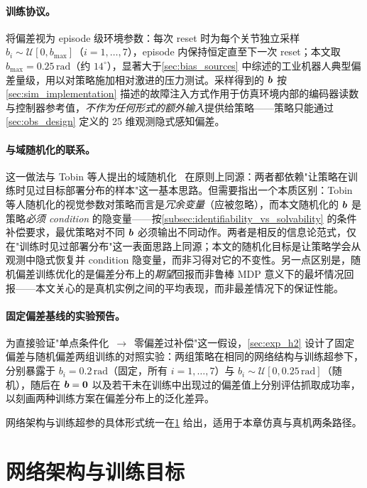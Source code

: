 \paragraph{训练协议。}将偏差视为 episode 级环境参数：每次 reset 时为每个关节独立采样 $b_i \sim \mathcal{U}[0, b_{\max}]$（$i = 1, \dots, 7$），episode 内保持恒定直至下一次 reset；本文取 $b_{\max} = 0.25\,\text{rad}$（约 $14^\circ$），显著大于\cref{sec:bias_sources} 中综述的工业机器人典型偏差量级，用以对策略施加相对激进的压力测试。采样得到的 $\bm{b}$ 按\cref{sec:sim_implementation} 描述的故障注入方式作用于仿真环境内部的编码器读数与控制器参考值，\emph{不作为任何形式的额外输入}提供给策略——策略只能通过\cref{sec:obs_design} 定义的 25 维观测隐式感知偏差。

\paragraph{与域随机化的联系。}这一做法与 Tobin 等人提出的域随机化~\cite{tobin2017domain} 在原则上同源：两者都依赖"让策略在训练时见过目标部署分布的样本"这一基本思路。但需要指出一个本质区别：Tobin 等人随机化的视觉参数对策略而言是\emph{冗余变量}（应被忽略），而本文随机化的 $\bm{b}$ 是策略\emph{必须 condition} 的隐变量——按\cref{subsec:identifiability_vs_solvability} 的条件补偿要求，最优策略对不同 $\bm{b}$ 必须输出不同动作。两者是相反的信息论范式，仅在"训练时见过部署分布"这一表面思路上同源；本文的随机化目标是让策略学会从观测中隐式恢复并 condition 隐变量，而非习得对它的不变性。另一点区别是，随机偏差训练优化的是偏差分布上的\emph{期望}回报而非鲁棒 MDP 意义下的最坏情况回报——本文关心的是真机实例之间的平均表现，而非最差情况下的保证性能。

\paragraph{固定偏差基线的实验预告。}为直接验证"单点条件化~$\to$~零偏差过补偿"这一假设，\cref{sec:exp_h2} 设计了固定偏差与随机偏差两组训练的对照实验：两组策略在相同的网络结构与训练超参下，分别暴露于 $b_i = 0.2\,\text{rad}$（固定，所有 $i = 1, \dots, 7$）与 $b_i \sim \mathcal{U}[0, 0.25\,\text{rad}]$（随机），随后在 $\bm{b}=\bm{0}$ 以及若干未在训练中出现过的偏差值上分别评估抓取成功率，以刻画两种训练方案在偏差分布上的泛化差异。

网络架构与训练超参的具体形式统一在\cref{sec:network} 给出，适用于本章仿真与真机两条路径。

\section{网络架构与训练目标}\label{sec:network}

